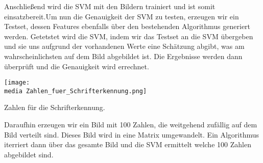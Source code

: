 Anschließend wird die SVM mit den Bildern trainiert und ist somit einsatzbereit.Um nun die Genauigkeit der SVM zu testen, erzeugen wir ein Testset, dessen Features ebenfalls über den bestehenden Algorithmus generiert werden. Getetstet wird die SVM, indem wir das Testset an die SVM übergeben und sie uns aufgrund der vorhandenen Werte eine Schätzung abgibt, was am wahrscheinlichsten auf dem Bild abgebildet ist. Die Ergebnisse werden dann überprüft und die Genauigkeit wird errechnet.

\begin{dsafigure}
\begin{center}
	\label{SESVM}
	\texttt{[image: \\media Zahlen\_fuer\_Schrifterkennung.png]}
	\caption{Zahlen für die Schrifterkennung.}
	\end{center}
\end{dsafigure}

Daraufhin erzeugen wir ein Bild mit 100 Zahlen, die weitgehend zufällig auf dem Bild verteilt sind. Dieses Bild wird in eine Matrix umgewandelt. Ein Algorithmus iterriert dann über das gesamte Bild und die SVM ermittelt welche 100 Zahlen abgebildet sind.


